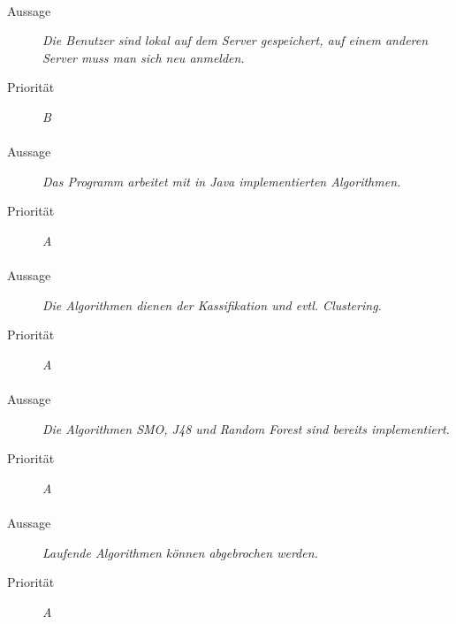 \paragraph{}
\begin{description}
\item[Aussage] \textit{Die Benutzer sind lokal auf dem Server gespeichert, auf einem anderen Server muss man sich neu anmelden.}
\item[Priorität] \textit{B}
\end{description}

\paragraph{}
\begin{description}
\item[Aussage] \textit{Das Programm arbeitet mit in Java implementierten Algorithmen.}
\item[Priorität] \textit{A}
\end{description}

\paragraph{}
\begin{description}
\item[Aussage] \textit{Die Algorithmen dienen der Kassifikation und evtl. Clustering.}
\item[Priorität] \textit{A}
\end{description}

\paragraph{}
\begin{description}
\item[Aussage] \textit{Die Algorithmen SMO, J48 und Random Forest sind bereits implementiert.}
\item[Priorität] \textit{A}
\end{description}

\paragraph{}
\begin{description}
\item[Aussage] \textit{Laufende Algorithmen können abgebrochen werden.}
\item[Priorität] \textit{A}
\end{description}

